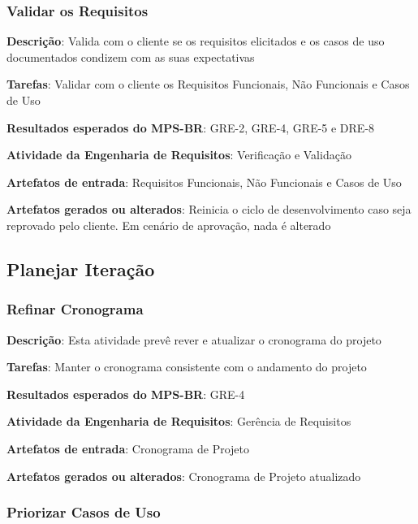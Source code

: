 \subsubsection{Validar os Requisitos}

\begin{description}
\item\textbf{Descrição}: Valida com o cliente se os requisitos elicitados e os casos de uso documentados condizem com as suas expectativas
\item\textbf{Tarefas}: Validar com o cliente os Requisitos Funcionais, Não Funcionais e Casos de Uso
\item\textbf{Resultados esperados do MPS-BR}: GRE-2, GRE-4, GRE-5 e DRE-8
\item\textbf{Atividade da Engenharia de Requisitos}: Verificação e Validação
\item\textbf{Artefatos de entrada}: Requisitos Funcionais, Não Funcionais e Casos de Uso
\item\textbf{Artefatos gerados ou alterados}: Reinicia o ciclo de desenvolvimento caso seja reprovado pelo cliente. Em cenário de aprovação, nada é alterado
\end{description}

\subsection{Planejar Iteração}

\subsubsection{Refinar Cronograma}

\begin{description}
\item\textbf{Descrição}: Esta atividade prevê rever e atualizar o cronograma do projeto
\item\textbf{Tarefas}: Manter o cronograma consistente com o andamento do projeto
\item\textbf{Resultados esperados do MPS-BR}: GRE-4
\item\textbf{Atividade da Engenharia de Requisitos}: Gerência de Requisitos
\item\textbf{Artefatos de entrada}: Cronograma de Projeto
\item\textbf{Artefatos gerados ou alterados}: Cronograma de Projeto atualizado
\end{description}

\subsubsection{Priorizar Casos de Uso}

